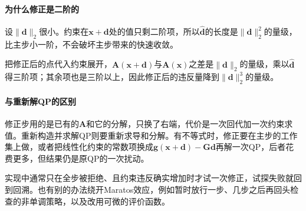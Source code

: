 \paragraph{为什么修正是二阶的}
设$\lVert\bm{d}\rVert_2$很小。约束在$\bm{x}+\bm{d}$处的值只剩二阶项，所以$\hat{\bm{d}}$的长度是$\lVert\bm{d}\rVert_2^2$的量级，比主步小一阶，不会破坏主步带来的快速收敛。

把修正后的点代入约束展开，$\bm{A}(\bm{x}+\bm{d})$与$\bm{A}(\bm{x})$之差是$\lVert\bm{d}\rVert_2$的量级，乘以$\hat{\bm{d}}$得三阶项；其余项也是三阶以上，因此修正后的违反量降到$\lVert\bm{d}\rVert_2^3$的量级。

\paragraph{与重新解QP的区别}
修正步用的是已有的$\bm{A}$和它的分解，只换了右端，代价是一次回代加一次约束求值。重新构造并求解QP则要重新求导和分解。有不等式时，修正要在主步的工作集上做，或者把线性化约束的常数项换成$\bm{g}(\bm{x}+\bm{d})-\bm{G}\bm{d}$再解一次QP，后者花费更多，但结果仍是原QP的一次扰动。

实现中通常只在全步被拒绝、且约束违反确实增加时才试一次修正，试探失败就回到回溯。也有别的办法绕开Maratos效应，例如暂时放行一步、几步之后再回头检查的非单调策略，以及改用可微的评价函数。
